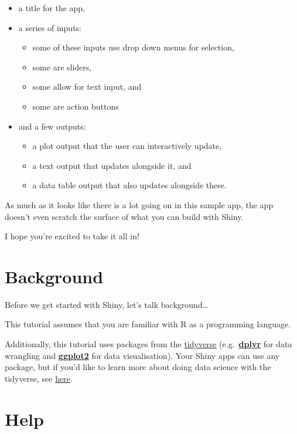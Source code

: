 \documentclass[
  letterpaper,
  DIV=11,
  numbers=noendperiod]{scrreprt}
\providecommand{\tightlist}{%
  \setlength{\itemsep}{0pt}\setlength{\parskip}{0pt}}
\begin{document}
\begin{itemize}
\tightlist
\item
  a title for the app,
\item
  a series of inputs:

  \begin{itemize}
  \tightlist
  \item
    some of these inputs use drop down menus for selection,
  \item
    some are sliders,
  \item
    some allow for text input, and
  \item
    some are action buttons
  \end{itemize}
\item
  and a few outputs:

  \begin{itemize}
  \tightlist
  \item
    a plot output that the user can interactively update,
  \item
    a text output that updates alongside it, and
  \item
    a data table output that also updates alongside these.
  \end{itemize}
\end{itemize}

As much as it looks like there is a lot going on in this sample app, the
app doesn't even scratch the surface of what you can build with Shiny.

I hope you're excited to take it all in!

\hypertarget{background}{%
\section{Background}\label{background}}

Before we get started with Shiny, let's talk background\ldots{}

This tutorial assumes that you are familiar with R as a programming
language.

Additionally, this tutorial uses packages from the
\href{https://tidyverse.org/}{tidyverse}
(e.g.~\href{https://dplyr.tidyverse.org/}{\textbf{dplyr}} for data
wrangling and \href{https://ggplot2.tidyverse.org/}{\textbf{ggplot2}}
for data visualisation). Your Shiny apps can use any package, but if
you'd like to learn more about doing data science with the tidyverse,
see \href{https://www.tidyverse.org/learn/}{here}.

\hypertarget{help}{%
\section{Help}\label{help}}
\end{document}
